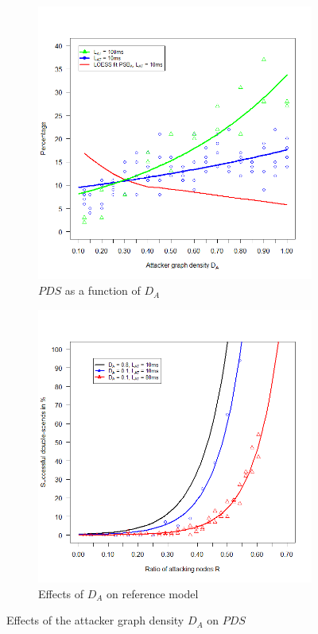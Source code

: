 \documentclass[a4paper,12pt,twoside]{report}
\begin{document}
\begin{figure}
\centering
\begin{subfigure}{.5\textwidth}
  \centering
  \includegraphics[width=\linewidth]{Experiments/AttDensity/attdens.png}
  \caption{$PDS$ as a function of $D_{A}$}
  \label{attdens:a}
\end{subfigure}%
\begin{subfigure}{.5\textwidth}
  \centering
  \includegraphics[width=\linewidth]{Experiments/AttDensity/attdensrat.png}
  \caption{Effects of $D_{A}$ on reference model}
  \label{attdens:b}
\end{subfigure}
\caption{Effects of the attacker graph density $D_{A}$ on $PDS$}
\label{attdens}
\end{figure}
\end{document}
